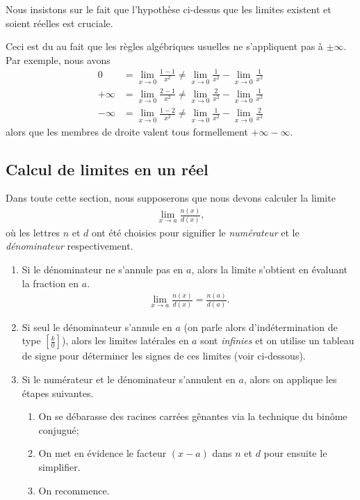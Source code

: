\documentclass[main.tex]{subfiles}
\begin{document}
\begin{remark}
    Nous insistons sur le fait que l'hypothèse ci-dessus
    que les limites existent et soient réelles
    est cruciale.

    Ceci est du au fait
    que les règles algébriques usuelles ne s'appliquent pas à $\pm \infty$.
    Par exemple,
    nous avons
    \begin{align}
        0 &= \lim_{x \to 0} \frac {1 - 1} {x^2} \neq \lim_{x \to 0} \frac 1 {x^2} - \lim_{x \to 0} \frac 1 {x^2}\\
        +\infty &= \lim_{x \to 0} \frac {2 - 1} {x^2} \neq \lim_{x \to 0} \frac 2 {x^2} - \lim_{x \to 0} \frac 1 {x^2}\\
        -\infty &= \lim_{x \to 0} \frac {1 - 2} {x^2} \neq \lim_{x \to 0} \frac 1 {x^2} - \lim_{x \to 0} \frac 2 {x^2}
    \end{align}
    alors que les membres de droite valent tous formellement $+\infty - \infty$.
\end{remark}

\subsection{Calcul de limites en un réel}

Dans toute cette section,
nous supposerons que nous devons calculer la limite
\begin{align}
    \lim_{x \to a} \frac {n(x)} {d(x)},
\end{align}
où les lettres $n$ et $d$ ont été choisies
pour signifier le \emph{numérateur} et le \emph{dénominateur} respectivement.

\begin{enumerate}
    \item Si le dénominateur ne s'annule pas en $a$,
        alors la limite s'obtient en évaluant la fraction en $a$.
        \begin{align}
            \lim_{x \to a} \frac {n(x)} {d(x)} = \frac {n(a)} {d(a)}.
        \end{align}
    \item Si seul le dénominateur s'annule en $a$
        (on parle alors d'indétermination de type $\left[\frac k 0\right]$),
        alors les limites latérales en $a$ sont \emph{infinies}
        et on utilise un tableau de signe pour déterminer les signes de ces limites
        (voir ci-dessous).
    \item Si le numérateur et le dénominateur s'annulent en $a$,
        alors on applique les étapes suivantes.
        \begin{enumerate}
            \item On se débarasse des racines carrées gênantes via la technique du binôme conjugué;
            \item On met en évidence le facteur $(x - a)$ dans $n$ et $d$ pour ensuite le simplifier.
            \item On recommence.
        \end{enumerate}
\end{enumerate}
\end{document}
